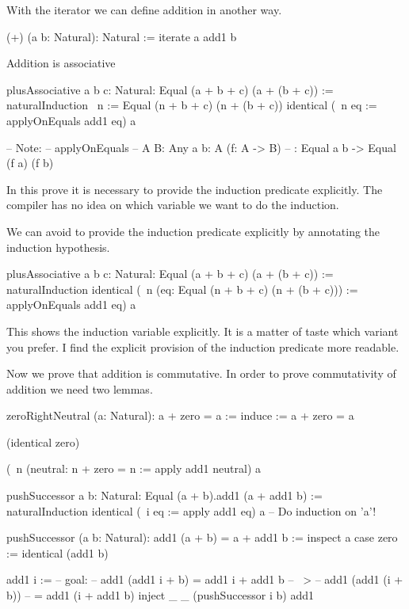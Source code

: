 With the iterator we can define addition in another way.

\begin{alba}
    (+) (a b: Natural): Natural :=
        iterate a add1 b
\end{alba}


Addition is associative
%
\begin{alba}
    plusAssociative {a b c: Natural}: Equal (a + b + c) (a + (b + c)) :=
        naturalInduction
            {\ n := Equal (n + b + c) (n + (b + c))}
            identical
            (\ {n} eq := applyOnEquals add1 eq)
            {a}

    -- Note:
    -- applyOnEquals
    --      {A B: Any} {a b: A} (f: A -> B)
    --      : Equal a b -> Equal (f a) (f b)
\end{alba}

In this prove it is necessary to provide the induction predicate explicitly. The
compiler has no idea on which variable we want to do the induction.

We can avoid to provide the induction predicate explicitly by annotating the
induction hypothesis.

\begin{alba}
    plusAssociative {a b c: Natural}: Equal (a + b + c) (a + (b + c)) :=
        naturalInduction
            identical
            (\ {n} (eq: Equal (n + b + c) (n + (b + c))) :=
                applyOnEquals add1 eq)
            {a}
\end{alba}
%
This shows the induction variable explicitly. It is a matter of taste which
variant you prefer. I find the explicit provision of the induction predicate
more readable.


Now we prove that addition is commutative. In order to prove commutativity of
addition we need two lemmas.

\begin{alba}
    zeroRightNeutral (a: Natural): a + zero = a :=
        induce
            {\a := a + zero = a}

            (identical zero)

            (\ n (neutral: n + zero = n :=
                apply add1 neutral)
            a
\end{alba}



\begin{alba}
    pushSuccessor {a b: Natural}: Equal (a + b).add1  (a + add1 b) :=
        naturalInduction
            identical
            (\ {i} eq := apply add1 eq)
            {a}         -- Do induction on 'a'!

    pushSuccessor (a b: Natural): add1 (a + b) = a + add1 b :=
        inspect a case
            zero :=
                identical (add1 b)

            add1 i :=
                -- goal:
                --   add1 (add1 i + b) = add1 i + add1 b
                -- ~>
                --   add1 (add1 (i + b))
                --   = add1 (i + add1 b)
                inject _ _
                    (pushSuccessor i b)
                    add1
\end{alba}



